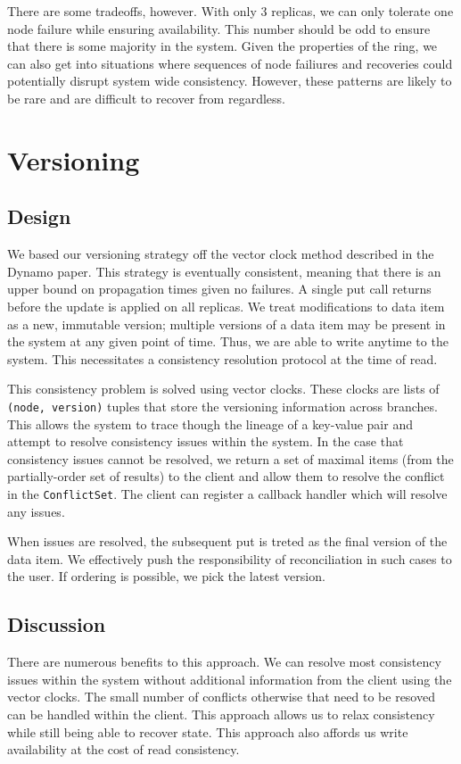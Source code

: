 \documentclass[paper=a4,fontsize=11pt]{report} %
\numberwithin{equation}{section} %
\numberwithin{figure}{section} %
\numberwithin{table}{section} %
\begin{document}
There are some tradeoffs, however. With only 3 replicas, we can only tolerate one node failure while ensuring availability. This number should be odd to ensure that there is some majority in the system. Given the properties of the ring, we can also get into situations where sequences of node failiures and recoveries could potentially disrupt system wide consistency. However, these patterns are likely to be rare and are difficult to recover from regardless.

\section{Versioning}

\subsection{Design}
We based our versioning strategy off the vector clock method described in the Dynamo paper. This strategy is eventually consistent, meaning that there is an upper bound on propagation times given no failures. A single put call returns before the update is applied on all replicas. We treat modifications to data item as a new, immutable version; multiple versions of a data item may be present in the system at any given point of time. Thus, we are able to write anytime to the system. This necessitates a consistency resolution protocol at the time of read.

This consistency problem is solved using vector clocks. These clocks are lists of \texttt{(node, version)} tuples that store the versioning information across branches. This allows the system to trace though the lineage of a key-value pair and attempt to resolve consistency issues within the system. In the case that consistency issues cannot be resolved, we return a set of maximal items (from the partially-order set of results) to the client and allow them to resolve the conflict in the \texttt{ConflictSet}. The client can register a callback handler which will resolve any issues.

When issues are resolved, the subsequent put is treted as the final version of the data item. We effectively push the responsibility of reconciliation in such cases to the user. If ordering is possible, we pick the latest version. 

\subsection{Discussion}
There are numerous benefits to this approach. We can resolve most consistency issues within the system without additional information from the client using the vector clocks. The small number of conflicts otherwise that need to be resoved can be handled within the client. This approach allows us to relax consistency while still being able to recover state. This approach also affords us write availability at the cost of read consistency.
\end{document}
